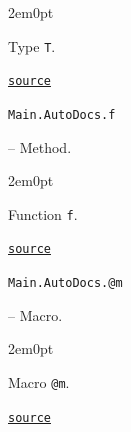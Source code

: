 \begin{adjustwidth}{2em}{0pt}

Type \texttt{T}.



\href{https://example.org/Repository.jl/blob/make.jl#L94-94}{\texttt{source}}


\end{adjustwidth}
\hypertarget{18320381193152274921}{\texttt{Main.AutoDocs.f}}  -- {Method.}

\begin{adjustwidth}{2em}{0pt}

Function \texttt{f}.



\href{https://example.org/Repository.jl/blob/make.jl#L88-88}{\texttt{source}}


\end{adjustwidth}
\hypertarget{8284453562940888863}{\texttt{Main.AutoDocs.@m}}  -- {Macro.}

\begin{adjustwidth}{2em}{0pt}

Macro \texttt{@m}.



\href{https://example.org/Repository.jl/blob/make.jl#L97-97}{\texttt{source}}


\end{adjustwidth}


